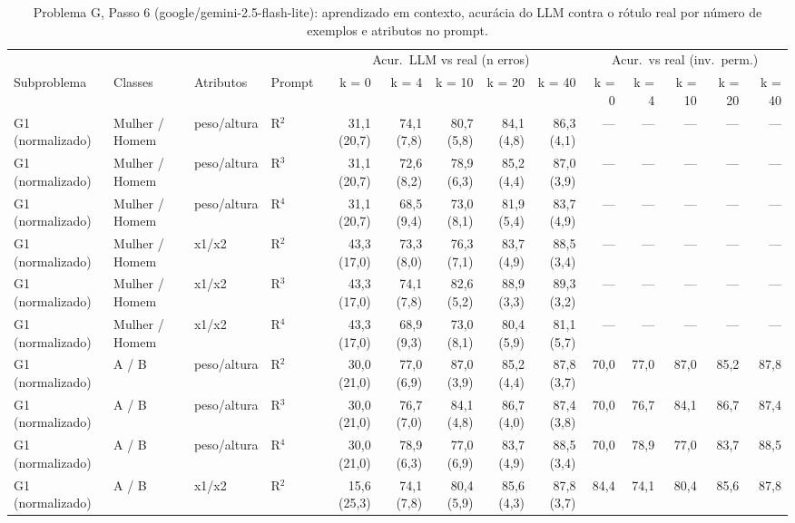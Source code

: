 \begin{table}[htbp]
\centering
\footnotesize
\caption{Problema G, Passo 6 (google/gemini-2.5-flash-lite): aprendizado em contexto, acurácia do LLM contra o rótulo real por número de exemplos e atributos no prompt.}
\label{tab:bloco3_G_passo6_k_flashlite}
\begin{tabular}{llllrrrrrrrrrr}
\toprule
 &  &  &  & \multicolumn{5}{c}{Acur.\ LLM vs real (n erros)} & \multicolumn{5}{c}{Acur.\ vs real (inv.\ perm.)} \\ \cmidrule(lr){5-9} \cmidrule(lr){10-14}
Subproblema & Classes & Atributos & Prompt & k = 0 & k = 4 & k = 10 & k = 20 & k = 40 & k = 0 & k = 4 & k = 10 & k = 20 & k = 40 \\
\midrule
G1 (normalizado) & Mulher / Homem & peso/altura & R$^2$ & 31,1 (20,7) & 74,1 (7,8) & 80,7 (5,8) & 84,1 (4,8) & 86,3 (4,1) & — & — & — & — & — \\
G1 (normalizado) & Mulher / Homem & peso/altura & R$^3$ & 31,1 (20,7) & 72,6 (8,2) & 78,9 (6,3) & 85,2 (4,4) & 87,0 (3,9) & — & — & — & — & — \\
G1 (normalizado) & Mulher / Homem & peso/altura & R$^4$ & 31,1 (20,7) & 68,5 (9,4) & 73,0 (8,1) & 81,9 (5,4) & 83,7 (4,9) & — & — & — & — & — \\
G1 (normalizado) & Mulher / Homem & x1/x2 & R$^2$ & 43,3 (17,0) & 73,3 (8,0) & 76,3 (7,1) & 83,7 (4,9) & 88,5 (3,4) & — & — & — & — & — \\
G1 (normalizado) & Mulher / Homem & x1/x2 & R$^3$ & 43,3 (17,0) & 74,1 (7,8) & 82,6 (5,2) & 88,9 (3,3) & 89,3 (3,2) & — & — & — & — & — \\
G1 (normalizado) & Mulher / Homem & x1/x2 & R$^4$ & 43,3 (17,0) & 68,9 (9,3) & 73,0 (8,1) & 80,4 (5,9) & 81,1 (5,7) & — & — & — & — & — \\
G1 (normalizado) & A / B & peso/altura & R$^2$ & 30,0 (21,0) & 77,0 (6,9) & 87,0 (3,9) & 85,2 (4,4) & 87,8 (3,7) & 70,0 & 77,0 & 87,0 & 85,2 & 87,8 \\
G1 (normalizado) & A / B & peso/altura & R$^3$ & 30,0 (21,0) & 76,7 (7,0) & 84,1 (4,8) & 86,7 (4,0) & 87,4 (3,8) & 70,0 & 76,7 & 84,1 & 86,7 & 87,4 \\
G1 (normalizado) & A / B & peso/altura & R$^4$ & 30,0 (21,0) & 78,9 (6,3) & 77,0 (6,9) & 83,7 (4,9) & 88,5 (3,4) & 70,0 & 78,9 & 77,0 & 83,7 & 88,5 \\
G1 (normalizado) & A / B & x1/x2 & R$^2$ & 15,6 (25,3) & 74,1 (7,8) & 80,4 (5,9) & 85,6 (4,3) & 87,8 (3,7) & 84,4 & 74,1 & 80,4 & 85,6 & 87,8 \\

\end{tabular}
\end{table}
